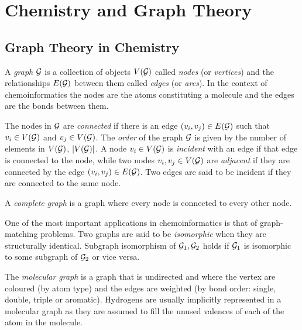 \section{Chemistry and Graph Theory}


\subsection{Graph Theory in Chemistry}

A \emph{graph} $\mathcal{G}$ is a collection of objects $V(\mathcal{G})$ called \emph{nodes} (or \emph{vertices}) and the relationships $E(\mathcal{G})$ between them called \emph{edges} (or \emph{arcs}). In the context of chemoinformatics the nodes are the atoms constituting a molecule and the edges are the bonds between them.

The nodes in $\mathcal{G}$ are \emph{connected} if there is an edge $(v_i, v_j) \in E(\mathcal{G})$ such that  $v_i \in V(\mathcal{G})$ and $v_j \in V(\mathcal{G})$. The \emph{order} of the graph $\mathcal{G}$ is given by the number of elements in $V(\mathcal{G})$, $\lvert V(\mathcal{G})\rvert$. A node $v_i \in V(\mathcal{G})$ is \emph{incident} with an edge if that edge is connected to the node, while two nodes $v_i, v_j \in V(\mathcal{G})$ are \emph{adjacent} if they are connected by the edge $(v_i, v_j) \in E(\mathcal{G})$. Two edges are said to be incident if they are connected to the same node.

A \emph{complete graph} is a graph where every node is connected to every other node.

One of the most important applications in chemoinformatics is that of graph-matching problems. Two graphs are said to be \emph{isomorphic} when they are structurally identical. Subgraph isomorphism of $\mathcal{G}_1, \mathcal{G}_2$ holds if $\mathcal{G}_1$ is isomorphic to some subgraph of $\mathcal{G}_2$ or vice versa.

The \emph{molecular graph} is a graph that is undirected and where the vertex are coloured (by atom type) and the edges are weighted (by bond order: single, double, triple or aromatic). Hydrogens are usually implicitly represented in a molecular graph as they are assumed to fill the unused valences of each of the atom in the molecule.